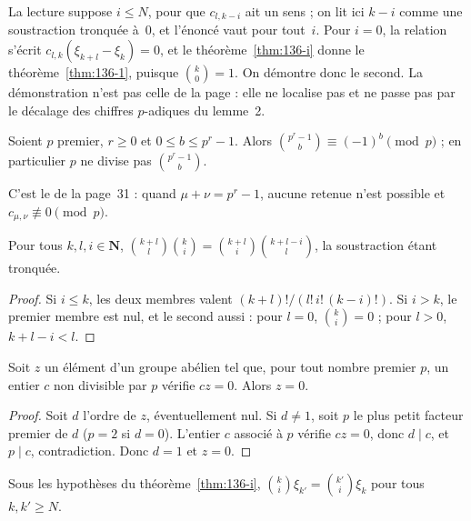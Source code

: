 La lecture suppose $i \leq N$, pour que $c_{l,k-i}$ ait un sens ; on lit ici $k - i$ comme une soustraction tronquée à~$0$, et l'énoncé vaut pour tout~$i$. Pour $i = 0$, la relation s'écrit $c_{l,k}(\xi_{k+l} - \xi_k) = 0$, et le théorème~\ref{thm:136-i} donne le théorème~\ref{thm:136-1}, puisque $\binom{k}{0} = 1$. On démontre donc le second. La démonstration n'est pas celle de la page : elle ne localise pas et ne passe pas par le décalage des chiffres $p$-adiques du lemme~2.

\begin{lemme}\label{lem:136-retenue}
Soient $p$ premier, $r \geq 0$ et $0 \leq b \leq p^r - 1$. Alors $\binom{p^r - 1}{b} \equiv (-1)^b \pmod p$ ; en particulier $p$ ne divise pas $\binom{p^r - 1}{b}$.
\end{lemme}


C'est le  de la page~31 : quand $\mu + \nu = p^r - 1$, aucune retenue n'est possible et $c_{\mu,\nu} \not\equiv 0 \pmod p$.

\begin{lemme}\label{lem:136-identite}
Pour tous $k, l, i \in \mathbf N$, $\binom{k+l}{l} \binom{k}{i} = \binom{k+l}{i} \binom{k+l-i}{l}$, la soustraction étant tronquée.
\end{lemme}

\begin{proof}
Si $i \leq k$, les deux membres valent $(k+l)!/(l!\, i!\, (k-i)!)$. Si $i > k$, le premier membre est nul, et le second aussi : pour $l = 0$, $\binom{k}{i} = 0$ ; pour $l > 0$, $k + l - i < l$.
\end{proof}

\begin{lemme}\label{lem:136-ordre}
Soit $z$ un élément d'un groupe abélien tel que, pour tout nombre premier $p$, un entier $c$ non divisible par $p$ vérifie $cz = 0$. Alors $z = 0$.
\end{lemme}

\begin{proof}
Soit $d$ l'ordre de $z$, éventuellement nul. Si $d \neq 1$, soit $p$ le plus petit facteur premier de $d$ ($p = 2$ si $d = 0$). L'entier $c$ associé à $p$ vérifie $cz = 0$, donc $d \mid c$, et $p \mid c$, contradiction. Donc $d = 1$ et $z = 0$.
\end{proof}

\begin{lemme}\label{lem:136-croise}
Sous les hypothèses du théorème~\ref{thm:136-i}, $\binom{k}{i} \xi_{k'} = \binom{k'}{i} \xi_k$ pour tous $k, k' \geq N$.
\end{lemme}

